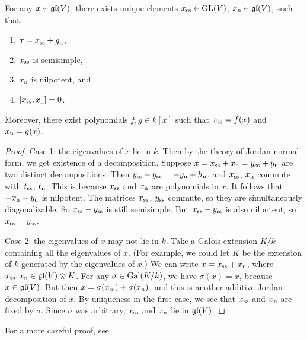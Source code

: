 \begin{theorem}
For any $x\in \mathfrak{gl}(V)$, there exists unique elements $x_{\mathrm{ss}}\in \operatorname{GL}(V)$, 
$x_{\mathrm{n}}\in \mathfrak{gl}(V)$, such that 
\begin{enumerate}
  \item $x=x_{\mathrm{ss}}+g_{\mathrm{n}}$, 
  \item $x_{\mathrm{ss}}$ is semisimple, 
  \item $x_{\mathrm{n}}$ is nilpotent, and 
  \item $[x_{\mathrm{ss}},x_{\mathrm{n}}]=0$. 
\end{enumerate}
Moreover, there exist polynomials $f,g\in k[x]$ such that 
$x_{\mathrm{ss}}=f(x)$ and $x_{\mathrm{n}}=g(x)$. 
\end{theorem}
\begin{proof}
Case 1: the eigenvalues of $x$ lie in $k$. Then by the theory of Jordan 
normal form, we get existence of a decomposition. 
Suppose $x=x_{\mathrm{ss}}+x_{\mathrm{n}} = y_{\mathrm{ss}}+y_{\mathrm{n}}$ are two 
distinct decompositions. Then 
$y_{\mathrm{ss}}-y_{\mathrm{ss}}=-y_{\mathrm{n}}+h_{\mathrm{n}}$, and 
$x_{\mathrm{ss}}$, $x_{\mathrm{n}}$ commute with $t_{\mathrm{ss}}$, $t_{\mathrm{n}}$. 
This is because $x_{\mathrm{ss}}$ and $x_{\mathrm{n}}$ are polynomials in $x$. It 
follows that $-x_{\mathrm{n}}+y_{\mathrm{n}}$ is nilpotent. The matrices 
$x_{\mathrm{ss}}$, $y_{\mathrm{ss}}$ commute, so they are simultaneously 
diagonalizable. So $x_{\mathrm{ss}}-y_{\mathrm{ss}}$ is still semisimple. But 
$x_{\mathrm{ss}}-y_{\mathrm{ss}}$ is also nilpotent, so 
$x_{\mathrm{ss}}=y_{\mathrm{ss}}$. 

Case 2: the eigenvalues of $x$ may not lie in $k$. Take a Galois extension 
$K/k$ containing all the eigenvalues of $x$. (For example, we could let $K$ be 
the extension of $k$ generated by the eigenvalues of $x$.) We can write 
$x=x_{\mathrm{ss}}+x_{\mathrm{n}}$, where 
$x_{\mathrm{ss}},x_{\mathrm{n}}\in \mathfrak{gl}(V)\otimes K$. For any 
$\sigma\in \operatorname{Gal}(K/k)$, we have $\sigma(x)=x$, because $x\in \mathfrak{gl}(V)$. But 
then $x=\sigma(x_{\mathrm{ss}})+\sigma(x_{\mathrm{n}})$, and this is another 
additive Jordan decomposition of $x$. By uniqueness in the first case, we 
see that $x_{\mathrm{ss}}$ and $x_{\mathrm{n}}$ are fixed by $\sigma$. Since 
$\sigma$ was arbitrary, $x_{\mathrm{ss}}$ and $x_{\mathrm{n}}$ lie in 
$\mathfrak{gl}(V)$. 
\end{proof}

For a more careful proof, see \cite[VII \S 5.8 thm.1]{bourbaki-algebra-4-7}. 


